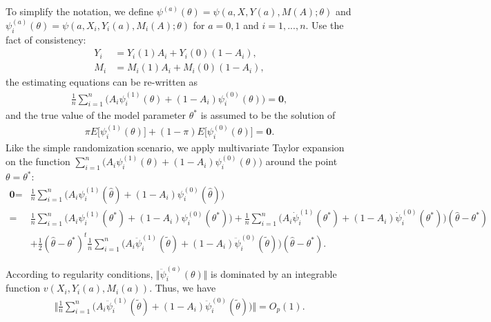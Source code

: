 \documentclass{article}
\begin{document}
To simplify the notation, we define $\psi^{(a)}(\theta)=\psi(a,X,Y(a),M(A);\theta)$ and $\psi_{i}^{(a)}(\theta)=\psi(a,X_i,Y_i(a),M_i(A);\theta)$ for $a=0,1$ and $i=1,...,n$. Use the fact of consistency: 
\begin{align}
    Y_i&=Y_i(1)A_i+Y_i(0)(1-A_i),\nonumber\\
    M_i&=M_i(1)A_i+M_i(0)(1-A_i)\nonumber,
\end{align}
the estimating equations can be re-written as 
\begin{align}
    \frac{1}{n}\sum_{i=1}^n \big(A_i \psi_{i}^{(1)}(\theta)+(1-A_i)\psi_{i}^{(0)}(\theta)\big) = \textbf{0}\nonumber,
\end{align}
and the true value of the model parameter $\theta^*$ is assumed to be the solution of 
\begin{align}
    \pi E\big[\psi_{i}^{(1)}(\theta)\big]+(1-\pi)E\big[\psi_{i}^{(0)}(\theta)\big] = \textbf{0}\nonumber.
\end{align}
Like the simple randomization scenario, we apply multivariate Taylor expansion on the function $\sum_{i=1}^n \big(A_i \psi_{i}^{(1)}(\theta)+(1-A_i)\psi_{i}^{(0)}(\theta)\big)$ around the point $\theta=\theta^*$:
\begin{align}
    \textbf{0}=&\frac{1}{n}\sum_{i=1}^n \big(A_i \psi_{i}^{(1)}(\hat{\theta})+(1-A_i)\psi_{i}^{(0)}(\hat{\theta})\big)\nonumber\\
    =&\frac{1}{n}\sum_{i=1}^n \big(A_i \psi_{i}^{(1)}(\theta^*)+(1-A_i)\psi_{i}^{(0)}(\theta^*)\big)+\frac{1}{n}\sum_{i=1}^n \big(A_i \dot\psi_{i}^{(1)}(\theta^*)+(1-A_i)\dot\psi_{i}^{(0)}(\theta^*)\big)(\hat{\theta} -\theta^*)\nonumber\\
    &+\frac{1}{2}(\hat{\theta} -\theta^*)^{t}\frac{1}{n}\sum_{i=1}^n \big(A_i \ddot\psi_{i}^{(1)}(\widetilde{\theta})+(1-A_i)\ddot\psi_{i}^{(0)}(\widetilde{\theta})\big) (\hat{\theta} -\theta^*)\nonumber.
\end{align}

According to regularity conditions, $\Vert \ddot\psi_{i}^{(a)}(\theta)\Vert$ is dominated by an integrable function $v(X_i,Y_i(a),M_i(a))$. Thus, we have 
\begin{align}
    \Vert \frac{1}{n}\sum_{i=1}^n \big(A_i \ddot\psi_{i}^{(1)}(\widetilde{\theta})+(1-A_i)\ddot\psi_{i}^{(0)}(\widetilde{\theta})\big) \Vert = O_p(1)\nonumber.
\end{align}
\end{document}
